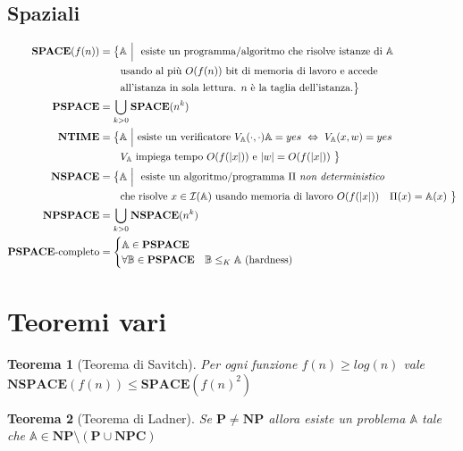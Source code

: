 \documentclass[a4paper, 11pt]{article}
\newcommand{\p}{\mathbf{P}}
\newcommand{\np}{\mathbf{NP}}
\newcommand{\npc}{\mathbf{NPC}}
\newcommand{\ntime}{\mathbf{NTIME}}
\newcommand{\Space}{\mathbf{SPACE}}
\newcommand{\pspace}{\mathbf{PSPACE}}
\newcommand{\nspace}{\mathbf{NSPACE}}
\newcommand{\npspace}{\mathbf{NPSPACE}}
\newcommand{\prob}[1]{\mathbb{#1}}
\newcommand{\instance}[1]{\mathcal{I}(\prob{#1})}
\newtheorem{thm}{Teorema}[subsection]
\begin{document}
	\subsection{Spaziali}
	\begin{align*}
		\Space(f(n)) &= \big\lbrace \prob{A}\ \Big|\ \text{ esiste un programma/algoritmo che risolve istanze di } \prob{A} \\ 
		& \qquad \text{usando al più } O(f(n)) \text{ bit di memoria di lavoro e accede }\\
		&\qquad \text{all'istanza in sola lettura. } n \text{ è la taglia dell'istanza}. \big\rbrace \\
		\pspace &= \bigcup\limits_{k > 0} \Space(n^k) \\
			\ntime &= \big\lbrace \prob{A} \ \Big| \ \text{esiste un verificatore } V_{\prob{A}}(\cdot, \cdot) \prob{A} = yes \ \Leftrightarrow\ V_{\prob{A}}(x, w) = yes \\
		& \qquad V_{\prob{A}} \text{ impiega tempo } O(f(\vert x \vert)) \text{ e }\vert w \vert = O(f(\vert x \vert)) \ \big\rbrace \\
		\nspace &= \big\lbrace  \prob{A}\ \Big| \ \text{ esiste un algoritmo/programma } \Pi \text{ \textit{non deterministico}} \\
		& \qquad \text{che risolve } x \in \instance{A} \text{ usando memoria di lavoro } O(f(\vert x\vert)) \quad \Pi(x) = \prob{A}(x) \ \big\rbrace \\
		\npspace &= \bigcup\limits_{k > 0} \nspace(n^k) \\
		\pspace\text{-completo} &=\begin{cases}
		 \prob{A} \in \pspace  \\
		 \forall \prob{B} \in \pspace \quad \prob{B} \leq_K \prob{A} \  (\text{hardness}) \\
		\end{cases}\\
	\end{align*}
	
	\section{Teoremi vari}
	\begin{thm}[Teorema di Savitch]
		Per ogni funzione $f(n) \geq log(n)$ vale \\ $ \nspace(f(n)) \leq \Space(f(n)^2) $
	\end{thm}

	\begin{thm}[Teorema di Ladner]
		Se $\p \neq \np$ allora esiste un problema $\mathbb{A}$ tale che $\prob{A} \in \np \setminus (\p \cup \npc)$
	\end{thm}
	
\end{document}
